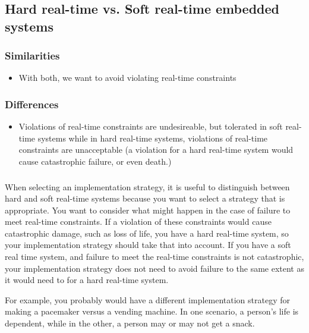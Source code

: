 \subsection*{Hard real-time vs. Soft real-time embedded systems}

\subsubsection*{Similarities}
\begin{itemize}
  \item With both, we want to avoid violating real-time constraints
\end{itemize}

\subsubsection*{Differences}
\begin{itemize}
  \item Violations of real-time constraints are undesireable, but tolerated in
    soft real-time systems while in hard real-time systems, violations of
    real-time constraints are unacceptable (a violation for a hard real-time
    system would cause catastrophic failure, or even death.)
\end{itemize}


\subsubsection*{}
When selecting an implementation strategy, it is useful to distinguish between
hard and soft real-time systems because you want to select a strategy that is
appropriate. You want to consider what might happen in the case of failure to 
meet real-time constraints. If a violation of these constraints would cause
catastrophic damage, such as loss of life, you have a hard real-time system,
so your implementation strategy should take that into account. If you have a
soft real time system, and failure to meet the real-time constraints is not
catastrophic, your implementation strategy does not need to avoid
failure to the same extent as it would need to for a hard real-time system.

For example, you probably would have a different implementation strategy for
making a pacemaker versus a vending machine. In one scenario, a person's life is
dependent, while in the other, a person may or may not get a snack.
